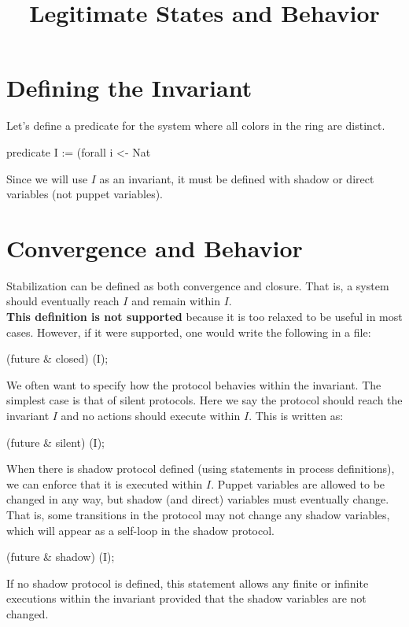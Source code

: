 
\title{Legitimate States and Behavior}
\date{}



\section{Defining the Invariant}

Let's define a predicate for the system where all colors in the ring are distinct.
\begin{code}
predicate I := (forall i <- Nat %
\end{code}

Since we will use $I$ as an invariant, it must be defined with shadow or direct variables (not puppet variables).

\section{Convergence and Behavior}

Stabilization can be defined as both convergence and closure.
That is, a system should eventually reach $I$ and remain within $I$.
\\\textbf{This definition is not supported} because it is too relaxed to be useful in most cases.
However, if it were supported, one would write the following in a  file:
\begin{code}
(future & closed) (I);
\end{code}

We often want to specify how the protocol behavies within the invariant.
The simplest case is that of silent protocols.
Here we say the protocol should reach the invariant $I$ and no actions should execute within $I$.
This is written as:
\begin{code}
(future & silent) (I);
\end{code}

When there is shadow protocol defined (using  statements in process definitions), we can enforce that it is executed within $I$.
Puppet variables are allowed to be changed in any way, but shadow (and direct) variables must eventually change.
That is, some transitions in the protocol may not change any shadow variables, which will appear as a self-loop in the shadow protocol.
\begin{code}
(future & shadow) (I);
\end{code}
If no shadow protocol is defined, this statement allows any finite or infinite executions within the invariant provided that the shadow variables are not changed.


